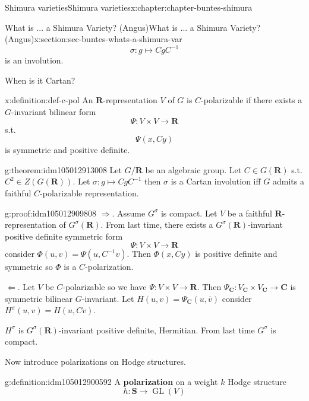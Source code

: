 \documentclass[oneside,10pt,]{book}
\newcommand{\terminology}[1]{\textbf{#1}}
\numberwithin{equation}{section}
\newcommand{\inv}{^{-1}}
\newcommand{\RR}{\mathbf{R}}
\newcommand{\CC}{\mathbf{C}}
\DeclareMathOperator{\GL}{GL}
\begin{document}
\begin{chapterptx}{Shimura varieties}{}{Shimura varieties}{}{}{x:chapter:chapter-buntes-shimura}
\begin{sectionptx}{What is ... a Shimura Variety? (Angus)}{}{What is ... a Shimura Variety? (Angus)}{}{}{x:section:sec-buntes-whats-a-shimura-var}
\begin{equation*}
\sigma \colon g \mapsto CgC\inv
\end{equation*}
is an involution.%
\par
When is it Cartan?%
\begin{definition}{}{x:definition:def-c-pol}%
An \(\RR\)-representation \(V\) of \(G\) is \(C\)-polarizable if there exists a \(G\)-invariant bilinear form%
\begin{equation*}
\Psi \colon V \times V \to \RR
\end{equation*}
s.t.%
\begin{equation*}
\Psi(x,Cy)
\end{equation*}
is symmetric and positive definite.%
\end{definition}
\begin{theorem}{}{}{g:theorem:idm105012913008}%
Let \(G/\RR\) be an algebraic group. Let \(C  \in G(\RR)\) s.t. \(C^2 \in Z(G(\RR))\). Let \(\sigma \colon g\mapsto Cg C\inv\)  then \(\sigma\) is a Cartan involution iff \(G\) admits a faithful \(C\)-polarizable representation.%
\end{theorem}
\begin{proofptx}{}{g:proof:idm105012909808}
\(\Rightarrow\). Assume \(G^\sigma \) is compact. Let \(V\) be a faithful \(\RR\)-representation of \(G^\sigma (\RR)\). From last time, there exists a \(G^\sigma(\RR)\)-invariant positive definite symmetric form%
\begin{equation*}
\Psi\colon V\times V\to \RR
\end{equation*}
consider \(\Phi(u,v) = \Psi(u, C\inv v)\). Then \(\Phi(x,Cy)\) is positive definite and symmetric so \(\Phi\) is a \(C\)-polarization.%
\par
\(\Leftarrow\). Let \(V\) be \(C\)-polarizable so we have \(\Psi \colon V\times V \to  \RR\). Then \(\Psi_\CC \colon V_\CC \times V_\CC \to \CC\) is symmetric bilinear \(G\)-invariant. Let \(H(u,v) = \Psi_\CC(u,\bar v)\) consider \(H^\sigma(u,v) = H(u,Cv)\).%
\par
\(H^\sigma\) is \(G^\sigma(\RR)\)-invariant positive definite, Hermitian. From last time \(G^\sigma\) is compact.%
\end{proofptx}
Now introduce polarizations on Hodge structures.%
\begin{definition}{}{g:definition:idm105012900592}%
A \terminology{polarization} on a weight \(k\) Hodge structure%
\begin{equation*}
h\colon \mathbf S \to \GL(V)
\end{equation*}
%
\begin{equation*}

\end{equation*}
\end{definition}
\end{sectionptx}
\end{chapterptx}
\end{document}
